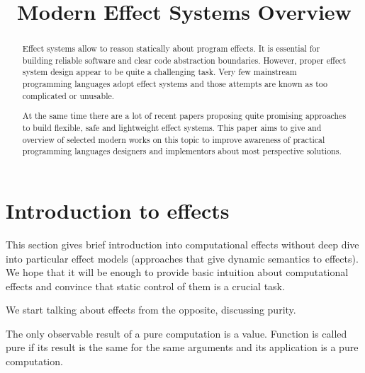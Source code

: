 \documentclass[conference]{IEEEtran}
\begin{document}
    \title{Modern Effect Systems Overview
    }

    \author{
    }

    \maketitle


    \begin{abstract}
        Effect systems allow to reason statically about program effects.
        It is essential for building reliable software and clear code abstraction boundaries.
        However, proper effect system design appear to be quite a challenging task.
        Very few mainstream programming languages adopt effect systems and those attempts are known as too complicated or unusable.

        At the same time there are a lot of recent papers proposing quite promising approaches to build flexible, safe and lightweight effect systems.
        This paper aims to give and overview of selected modern works on this topic to improve awareness of practical programming languages designers and implementors about most perspective solutions.
    \end{abstract}


    \section{Introduction to effects}

    This section gives brief introduction into computational effects without deep dive into particular effect models (approaches that give dynamic semantics to effects).
    We hope that it will be enough to provide basic intuition about computational effects and convince that static control of them is a crucial task.

    We start talking about effects from the opposite, discussing purity.

    The only observable result of a pure computation is a value.
    Function is called pure if its result is the same for the same arguments and its application is a pure computation.
\end{document}
